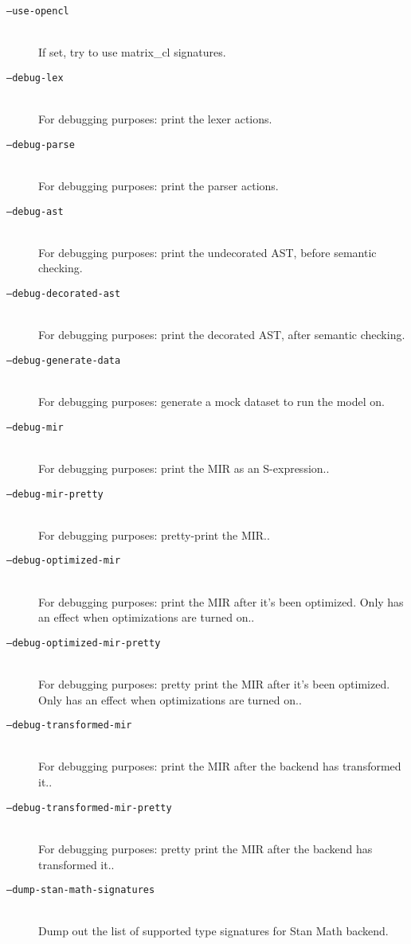 \begin{description}
%
\item[\tt  --use-opencl]
\mbox{ } \\ 
 If set, try to use matrix\_cl signatures.

%
\item[\tt  --debug-lex]
\mbox{} \\
For debugging purposes: print the lexer actions.

%
\item[\tt  --debug-parse]
\mbox{} \\
For debugging purposes: print the parser actions.

%
\item[\tt  --debug-ast]
\mbox{} \\
For debugging purposes: print the undecorated AST, before semantic checking.

%
\item[\tt  --debug-decorated-ast]
\mbox{} \\
For debugging purposes: print the decorated AST, after semantic checking.

%
\item[\tt  --debug-generate-data]
\mbox{} \\
For debugging purposes: generate a mock dataset to run the model on.

%
\item[\tt  --debug-mir]
\mbox{} \\
For debugging purposes: print the MIR as an S-expression..

%
\item[\tt  --debug-mir-pretty]
\mbox{} \\
For debugging purposes: pretty-print the MIR..

%
\item[\tt  --debug-optimized-mir]
\mbox{} \\
For debugging purposes: print the MIR after it's been optimized. Only has an effect when optimizations are turned on..

%
\item[\tt  --debug-optimized-mir-pretty]
\mbox{} \\
For debugging purposes: pretty print the MIR after it's been optimized. Only has an effect when optimizations are turned on..

%
\item[\tt  --debug-transformed-mir]
\mbox{} \\
For debugging purposes: print the MIR after the backend has transformed it..

%
\item[\tt  --debug-transformed-mir-pretty]
\mbox{} \\
For debugging purposes: pretty print the MIR after the backend has transformed it..

%
\item[\tt  --dump-stan-math-signatures]
\mbox{} \\
 Dump out the list of supported type signatures for Stan Math backend.
%
\end{description}
%


